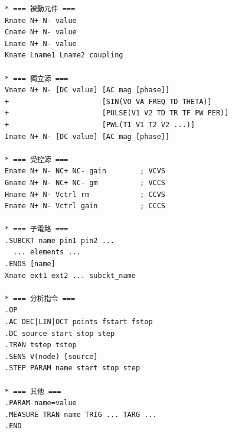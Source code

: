 \documentclass[12pt,a4paper]{article}
\begin{document}
\begin{lstlisting}[language=SPICE,caption={完整語法快速參考}]
* === 被動元件 ===
Rname N+ N- value
Cname N+ N- value
Lname N+ N- value
Kname Lname1 Lname2 coupling

* === 獨立源 ===
Vname N+ N- [DC value] [AC mag [phase]]
+                      [SIN(VO VA FREQ TD THETA)]
+                      [PULSE(V1 V2 TD TR TF PW PER)]
+                      [PWL(T1 V1 T2 V2 ...)]
Iname N+ N- [DC value] [AC mag [phase]]

* === 受控源 ===
Ename N+ N- NC+ NC- gain        ; VCVS
Gname N+ N- NC+ NC- gm          ; VCCS
Hname N+ N- Vctrl rm            ; CCVS
Fname N+ N- Vctrl gain          ; CCCS

* === 子電路 ===
.SUBCKT name pin1 pin2 ...
  ... elements ...
.ENDS [name]
Xname ext1 ext2 ... subckt_name

* === 分析指令 ===
.OP
.AC DEC|LIN|OCT points fstart fstop
.DC source start stop step
.TRAN tstep tstop
.SENS V(node) [source]
.STEP PARAM name start stop step

* === 其他 ===
.PARAM name=value
.MEASURE TRAN name TRIG ... TARG ...
.END
\end{lstlisting}
\end{document}
